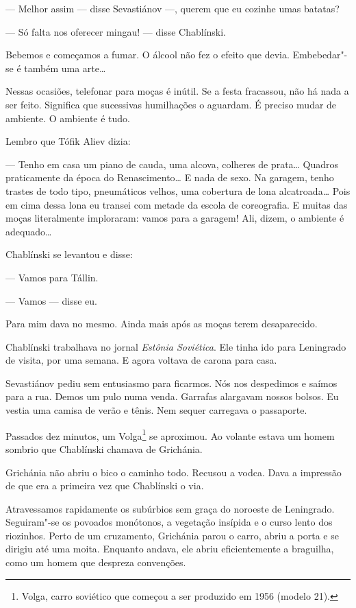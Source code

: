 --- Melhor assim --- disse Sevastiánov ---, querem que eu cozinhe umas
batatas?

--- Só falta nos oferecer mingau! --- disse Chablínski.

Bebemos e começamos a fumar. O álcool não fez o efeito que devia.
Embebedar"-se é também uma arte\ldots{}

Nessas ocasiões, telefonar para moças é inútil. Se a festa fracassou,
não há nada a ser feito. Significa que sucessivas humilhações o
aguardam. É preciso mudar de ambiente. O ambiente é tudo.

Lembro que Tófik Aliev dizia:

--- Tenho em casa um piano de cauda, uma alcova, colheres de prata\ldots{}
Quadros praticamente da época do Renascimento\ldots{} E nada de sexo. Na
garagem, tenho trastes de todo tipo, pneumáticos velhos, uma cobertura
de lona alcatroada\ldots{} Pois em cima dessa lona eu transei com metade da
escola de coreografia. E muitas das moças literalmente imploraram:
vamos para a garagem! Ali, dizem, o ambiente é adequado\ldots{}

Chablínski se levantou e disse:

--- Vamos para Tállin.

--- Vamos --- disse eu.

Para mim dava no mesmo. Ainda mais após as moças terem desaparecido.

Chablínski trabalhava no jornal \emph{Estônia Soviética}. Ele tinha ido
para Leningrado de visita, por uma semana. E agora voltava de carona
para casa.

Sevastiánov pediu sem entusiasmo para ficarmos. Nós nos despedimos e
saímos para a rua. Demos um pulo numa venda. Garrafas alargavam nossos \label{ref3}
bolsos. Eu vestia uma camisa de verão e tênis. Nem sequer carregava o
passaporte.

Passados dez minutos, um Volga\footnote{Volga, carro soviético que começou a ser produzido em 1956 (modelo  21).} se aproximou. Ao volante estava um homem sombrio que Chablínski chamava de Grichánia.

Grichánia não abriu o bico o caminho todo. Recusou a vodca. Dava a
impressão de que era a primeira vez que Chablínski o via.

Atravessamos rapidamente os subúrbios sem graça do noroeste de
Leningrado. Seguiram"-se os povoados monótonos, a vegetação insípida e o
curso lento dos riozinhos. Perto de um cruzamento, Grichánia parou o
carro, abriu a porta e se dirigiu até uma moita. Enquanto andava, ele
abriu eficientemente a braguilha, como um homem que despreza convenções.

